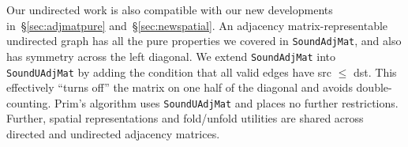 Our undirected work is also compatible with our new developments
in~\S\ref{sec:adjmatpure} and~\S\ref{sec:newspatial}.
An adjacency matrix-representable undirected graph
has all the pure properties we covered in \texttt{SoundAdjMat},
and also has symmetry across the left diagonal.
We extend \texttt{SoundAdjMat} into
\texttt{Sound{\color{red}U}AdjMat} by adding the condition that
all valid edges have src $\le$ dst. This effectively ``turns off'' the
matrix on one half of the diagonal and avoids double-counting. Prim's algorithm uses
\texttt{SoundUAdjMat} and places no further restrictions.
Further, spatial representations and fold/unfold utilities are shared
across directed and undirected adjacency matrices.


\lstset{style=myTinyStyle}


